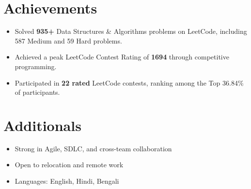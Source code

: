 \documentclass[10.5pt,a4paper]{article}
\begin{document}
\section*{Achievements}
\begin{itemize}
    \item Solved \textbf{935+} Data Structures \& Algorithms problems on LeetCode, including 587 Medium and 59 Hard problems.
    \item Achieved a peak LeetCode Contest Rating of \textbf{1694} through competitive programming.
    \item Participated in \textbf{22 rated} LeetCode contests, ranking among the Top 36.84\% of participants.
\end{itemize}

\section*{Additionals}
\begin{itemize}
    \item Strong in Agile, SDLC, and cross-team collaboration
    \item Open to relocation and remote work
    \item Languages: English, Hindi, Bengali
\end{itemize}
\end{document}
